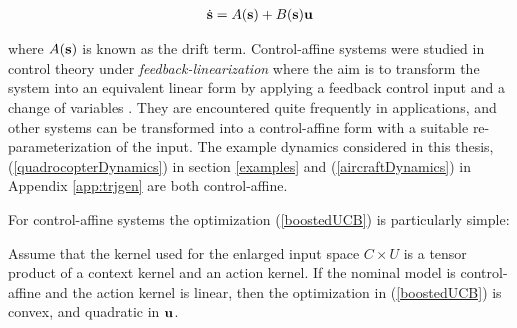 \begin{align}
\dot{{\mathbf{s}}} = A(\mathbf{s}) + B(\mathbf{s})\mathbf{u} \label{controlAffine}
\end{align}

where $A(\mathbf{s})$ is known as the drift term. Control-affine systems were studied in control theory under \emph{feedback-linearization} where the aim is to transform the system into an equivalent linear form by applying a feedback control input and a change of variables \cite{SlotineLi}. They are encountered quite frequently in applications, and other systems can be transformed into a control-affine form with a suitable re-parameterization of the input. The example dynamics considered in this thesis, (\ref{quadrocopterDynamics}) in section \ref{examples} and (\ref{aircraftDynamics}) in Appendix \ref{app:trjgen} are both control-affine.

For control-affine systems the optimization (\ref{boostedUCB}) is particularly simple:\\

\begin{proposition}[QP formulation]
Assume that the kernel used for the enlarged input space $C \times U$ is a tensor product of a context kernel and an action kernel. If the nominal model is control-affine and the action kernel is linear, then the optimization in (\ref{boostedUCB}) is convex, and quadratic in $\mathbf{u}$.
\label{Prop:2}
\end{proposition}

